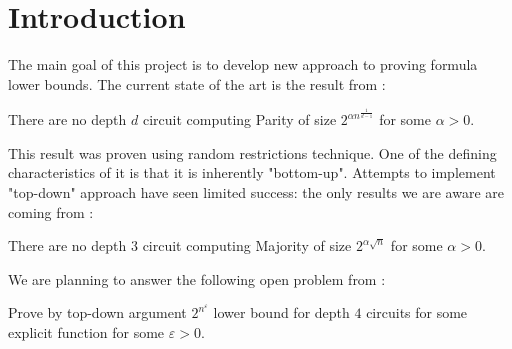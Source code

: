 \section{Introduction}

The main goal of this project is to develop new approach to proving formula lower bounds. The current
state of the art is the result from \cite{hastad1986almost}:
\begin{theorem}
    There are no depth $d$ circuit computing Parity of size $2^{\alpha n^{\frac{1}{d - 1}}}$ for some
    $\alpha > 0$.
\end{theorem}

This result was proven using random restrictions technique. One of the defining characteristics of it is
that it is inherently "bottom-up". Attempts to implement "top-down" approach have seen limited success:
the only results we are aware are coming from \cite{haastad1995top, meir2017prediction}: 
\begin{theorem}
    There are no depth $3$ circuit computing Majority of size $2^{\alpha \sqrt{n}}$ for some $\alpha > 0$.
\end{theorem}

We are planning to answer the following open problem from \cite{haastad1995top}:

\begin{open_problem}
    Prove by top-down argument $2^{n^{\varepsilon}}$ lower bound for depth $4$ circuits for some explicit
    function for some $\varepsilon > 0$.
\end{open_problem}


